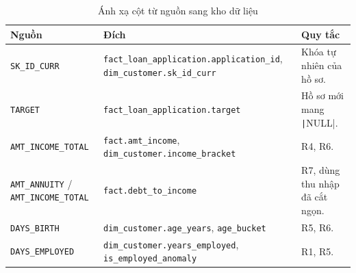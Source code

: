 \begin{table}[H]
	\centering
	\caption{Ánh xạ cột từ nguồn sang kho dữ liệu}
	\label{tab:etl-mapping}
	\footnotesize
	\begin{tabular}{p{4.6cm} p{5.4cm} p{5.4cm}}
		\toprule
		\textbf{Nguồn}                                                            & \textbf{Đích}                                                                                                                 & \textbf{Quy tắc}                                                                                                                    \\
		\midrule
		\texttt{SK\_ID\_CURR}                                                     & \texttt{fact\_loan\_application.}\allowbreak\texttt{application\_id}, \texttt{dim\_customer.}\allowbreak\texttt{sk\_id\_curr} & Khóa tự nhiên của hồ sơ.                                                                                                            \\
		\texttt{TARGET}                                                           & \texttt{fact\_loan\_application.}\allowbreak\texttt{target}                                                                   & Hồ sơ mới mang \texttt|NULL|.                                                                      \\
		\texttt{AMT\_INCOME\_TOTAL}                                               & \texttt{fact.amt\_income}, \texttt{dim\_customer.}\allowbreak\texttt{income\_bracket}                                         & R4, R6.                                                                                                                             \\
		\texttt{AMT\_ANNUITY} / \texttt{AMT\_INCOME\_TOTAL}                       & \texttt{fact.debt\_to\_income}                                                                                                & R7, dùng thu nhập đã cắt ngọn.                                                                                                      \\
		\texttt{DAYS\_BIRTH}                                                      & \texttt{dim\_customer.age\_years}, \texttt{age\_bucket}                                                                       & R5, R6.                                                                                                                             \\
		\texttt{DAYS\_EMPLOYED}                                                   & \texttt{dim\_customer.}\allowbreak\texttt{years\_employed}, \texttt{is\_employed\_anomaly}                                    & R1, R5.                                                                                                                             \\

\end{tabular}
\end{table}
